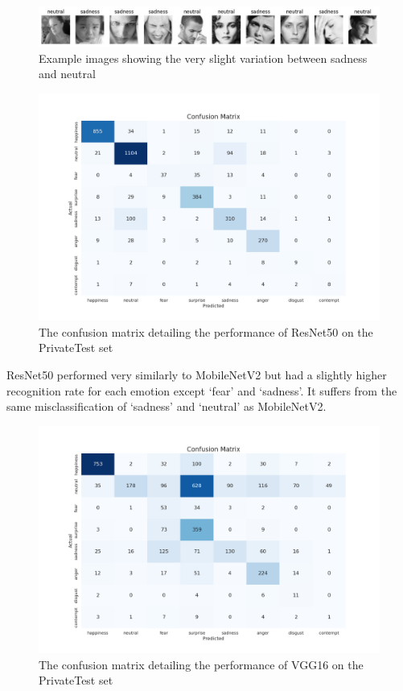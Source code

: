 \begin{figure}[H]
    \centering 
    \includegraphics[scale=0.38]{fed_images/sadness+neutral.png}
    \caption{Example images showing the very slight variation between sadness and neutral}
    \label{figure:sadneutral}
\end{figure}

\begin{figure}[H]
    \centering 
    \includegraphics[scale=0.38]{fed_images/conf_matrix_ResNet50.png}
    \caption{The confusion matrix detailing the performance of ResNet50 on the PrivateTest set}
    \label{figure:conf_rn50}
\end{figure}

ResNet50 performed very similarly to MobileNetV2 but had a slightly higher recognition rate for each emotion except ‘fear’ and ‘sadness’. It suffers from the same misclassification of ‘sadness’ and ‘neutral’ as MobileNetV2. 

\begin{figure}[H]
    \centering 
    \includegraphics[scale=0.38]{fed_images/conf_matrix_VGG16.png}
    \caption{The confusion matrix detailing the performance of VGG16 on the PrivateTest set}
    \label{figure:conf_vgg16}
\end{figure}

